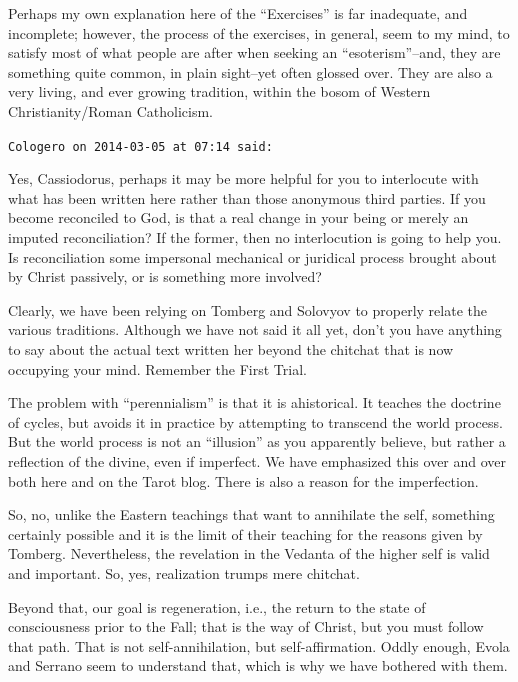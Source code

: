 \begin{footnotesize}
\begin{sffamily}
Perhaps my own explanation here of the ``Exercises'' is far inadequate, and incomplete; however, the process of the exercises, in general, seem to my mind, to satisfy most of what people are after when seeking an ``esoterism''--and, they are something quite common, in plain sight--yet often glossed over. They are also a very living, and ever growing tradition, within the bosom of Western Christianity/Roman Catholicism.

\hfill

\texttt{Cologero on 2014-03-05 at 07:14 said:}

Yes, Cassiodorus, perhaps it may be more helpful for you to interlocute with what has been written here rather than those anonymous third parties. If you become reconciled to God, is that a real change in your being or merely an imputed reconciliation? If the former, then no interlocution is going to help you. Is reconciliation some impersonal mechanical or juridical process brought about by Christ passively, or is something more involved?

Clearly, we have been relying on Tomberg and Solovyov to properly relate the various traditions. Although we have not said it all yet, don't you have anything to say about the actual text written her beyond the chitchat that is now occupying your mind. Remember the First Trial.

The problem with ``perennialism'' is that it is ahistorical. It teaches the doctrine of cycles, but avoids it in practice by attempting to transcend the world process. But the world process is not an ``illusion'' as you apparently believe, but rather a reflection of the divine, even if imperfect. We have emphasized this over and over both here and on the Tarot blog. There is also a reason for the imperfection.

So, no, unlike the Eastern teachings that want to annihilate the self, something certainly possible and it is the limit of their teaching for the reasons given by Tomberg. Nevertheless, the revelation in the Vedanta of the higher self is valid and important. So, yes, realization trumps mere chitchat.

Beyond that, our goal is regeneration, i.e., the return to the state of consciousness prior to the Fall; that is the way of Christ, but you must follow that path. That is not self-annihilation, but self-affirmation. Oddly enough, Evola and Serrano seem to understand that, which is why we have bothered with them.

\hfill


\end{sffamily}
\end{footnotesize}
